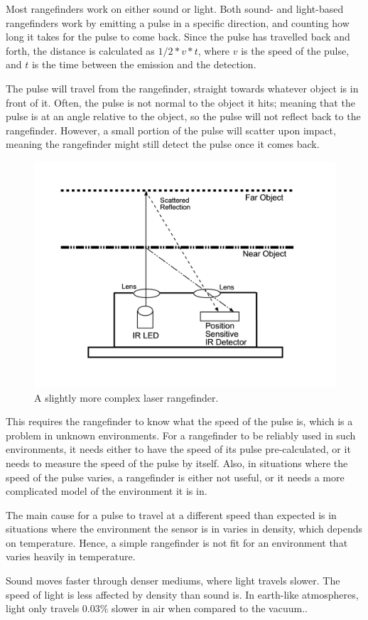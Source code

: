 Most rangefinders work on either sound or light. Both sound- and light-based rangefinders work by emitting a pulse in a specific direction, and counting how long it takes for the pulse to come back. Since the pulse has travelled back and forth, the distance is calculated as \(1/2*v*t\), where \(v\) is the speed of the pulse, and \(t\) is the time between the emission and the detection.

The pulse will travel from the rangefinder, straight towards whatever object is in front of it. Often, the pulse is not normal to the object it hits; meaning that the pulse is at an angle relative to the object, so the pulse will not reflect back to the rangefinder. However, a small portion of the pulse will scatter upon impact, meaning the rangefinder might still detect the pulse once it comes back.

\begin{figure}[H]
	\centering
	\includegraphics[width=.4\linewidth]{images/rangefinder.jpg}
	\caption{A slightly more complex laser rangefinder.}
	\label{fig:rangefinderIMG}
\end{figure}

This requires the rangefinder to know what the speed of the pulse is, which is a problem in unknown environments. For a rangefinder to be reliably used in such environments, it needs either to have the speed of its pulse pre-calculated, or it needs to measure the speed of the pulse by itself. Also, in situations where the speed of the pulse varies, a rangefinder is either not useful, or it needs a more complicated model of the environment it is in.

The main cause for a pulse to travel at a different speed than expected is in situations where the environment the sensor is in varies in density, which depends on temperature\cite{refraction}. Hence, a simple rangefinder is not fit for an environment that varies heavily in temperature.

Sound moves faster through denser mediums, where light travels slower. The speed of light is less affected by density than sound is. In earth-like atmospheres, light only travels 0.03\% slower in air when compared to the vacuum.\cite{refraction}\cite{speedOfSound}.

